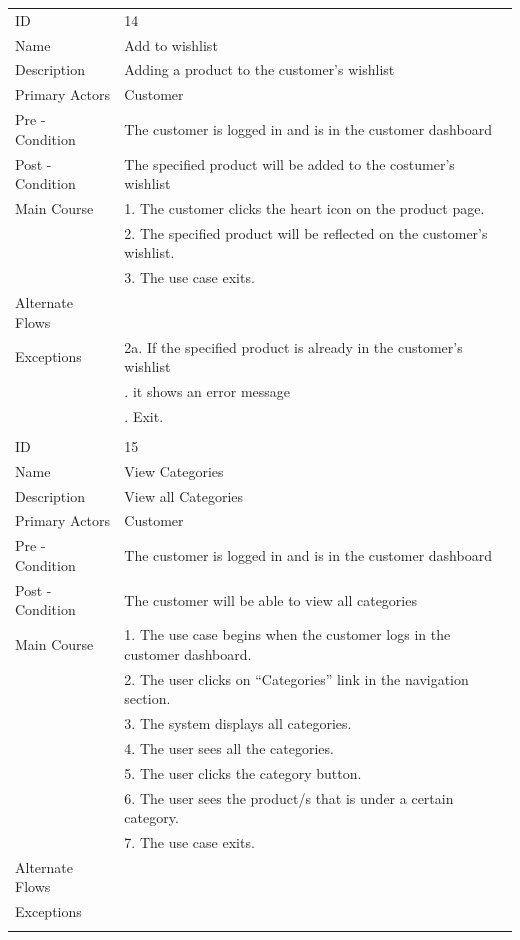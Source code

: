 \documentclass{report}
\begin{document}
\begin{tabular}{ l l }
ID 					& 14 \\
Name 				& Add to wishlist \\
Description 			& Adding a product to the customer’s wishlist \\ 
Primary Actors 		& Customer \\
Pre - Condition 		& The customer is logged in and is in the customer dashboard \\ 
Post - Condition 	& The specified product will be added to the costumer’s wishlist \\ 
Main Course			& 1. The customer clicks the heart icon on the product page. \\ 
     				& 2. The specified product will be reflected on the customer's wishlist. \\
     				& 3. The use case exits.\\
Alternate Flows		& \\
Exceptions 			& 2a. If the specified product is already in the customer’s wishlist \\
					& \qquad 1. it shows an error message \\
					& \qquad 2. Exit. \\ \\
ID 					& 15 \\
Name 				& View Categories \\
Description 			& View all Categories\\ 
Primary Actors 		& Customer \\
Pre - Condition 		& The customer is logged in and is in the customer dashboard \\ 
Post - Condition 	& The customer will be able to view all categories \\ 
Main Course			& 1. The use case begins when the customer logs in the customer dashboard. \\
					& 2. The user clicks on “Categories” link in the navigation section. \\
					& 3. The system displays all categories. \\
					& 4. The user sees all the categories. \\
					& 5. The user clicks the category button. \\
					& 6. The user sees the product/s that is under a certain category. \\
					& 7. The use case exits. \\
Alternate Flows		& \\
Exceptions 			& \\ \\

\end{tabular}
\end{document}

